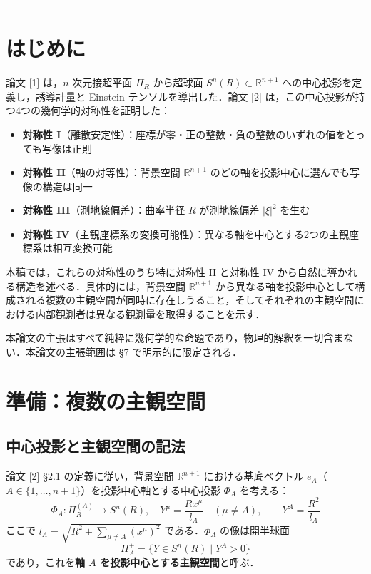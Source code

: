 \documentclass[a4paper,11pt]{ltjsarticle}
\theoremstyle{definition}
\begin{document}
\bigskip\hrule\bigskip

\section{はじめに}

論文 {[1]} は，\(n\) 次元接超平面 \(\Pi_R\) から超球面 \(S^n(R) \subset \mathbb{R}^{n+1}\) への中心投影を定義し，誘導計量と Einstein テンソルを導出した．論文 {[2]} は，この中心投影が持つ4つの幾何学的対称性を証明した：

\begin{itemize}
\item \textbf{対称性 I}（離散安定性）：座標が零・正の整数・負の整数のいずれの値をとっても写像は正則
\item \textbf{対称性 II}（軸の対等性）：背景空間 \(\mathbb{R}^{n+1}\) のどの軸を投影中心に選んでも写像の構造は同一
\item \textbf{対称性 III}（測地線偏差）：曲率半径 \(R\) が測地線偏差 \(|\xi|^2\) を生む
\item \textbf{対称性 IV}（主観座標系の変換可能性）：異なる軸を中心とする2つの主観座標系は相互変換可能
\end{itemize}

本稿では，これらの対称性のうち特に対称性 II と対称性 IV から自然に導かれる構造を述べる．具体的には，背景空間 \(\mathbb{R}^{n+1}\) から異なる軸を投影中心として構成される複数の主観空間が同時に存在しうること，そしてそれぞれの主観空間における内部観測者は異なる観測量を取得することを示す．

本論文の主張はすべて純粋に幾何学的な命題であり，物理的解釈を一切含まない．本論文の主張範囲は \S7 で明示的に限定される．

\section{準備：複数の主観空間}

\subsection{中心投影と主観空間の記法}

論文 {[2]} \S2.1 の定義に従い，背景空間 \(\mathbb{R}^{n+1}\) における基底ベクトル \(e_A\)（\(A \in \{1, \ldots, n+1\}\)）を投影中心軸とする中心投影 \(\Phi_A\) を考える：
\begin{equation}
\Phi_A: \Pi_R^{(A)} \to S^n(R), \quad Y^\mu = \frac{Rx^\mu}{l_A} \quad (\mu \neq A), \qquad Y^A = \frac{R^2}{l_A} \tag{2.1}
\end{equation}
ここで \(l_A = \sqrt{R^2 + \sum_{\mu \neq A}(x^\mu)^2}\) である．\(\Phi_A\) の像は開半球面
\begin{equation}
H_A^+ = \{Y \in S^n(R) \mid Y^A > 0\} \tag{2.2}
\end{equation}
であり，これを\textbf{軸 \(A\) を投影中心とする主観空間}と呼ぶ．
\end{document}
